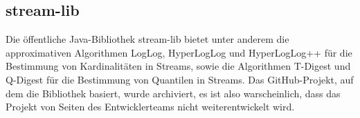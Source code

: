 \subsection{stream-lib}
Die öffentliche Java-Bibliothek stream-lib bietet unter anderem die approximativen Algorithmen LogLog, 
HyperLogLog und HyperLogLog++ für die Bestimmung von Kardinalitäten in Streams, 
sowie die Algorithmen T-Digest und Q-Digest für die Bestimmung von Quantilen in Streams. 
Das GitHub-Projekt, auf dem die Bibliothek basiert, wurde archiviert, 
es ist also warscheinlich, dass das Projekt von Seiten des Entwicklerteams nicht weiterentwickelt wird. 
